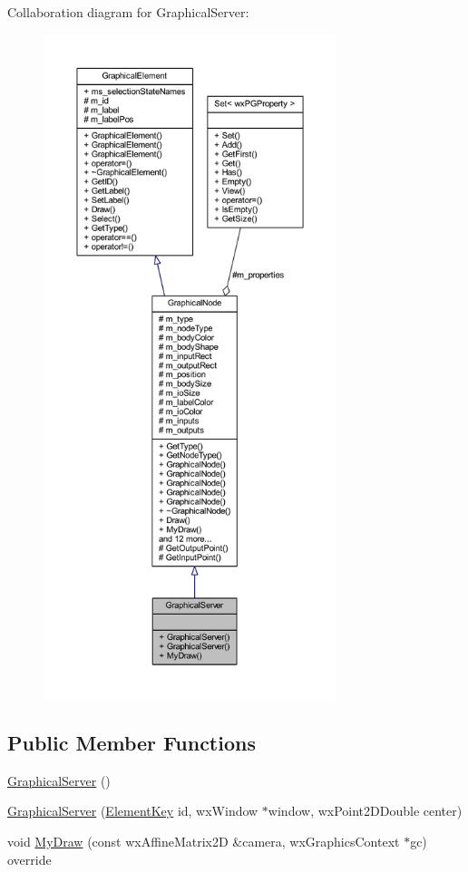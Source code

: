 Collaboration diagram for Graphical\+Server\+:
\nopagebreak
\begin{figure}[H]
\begin{center}
\leavevmode
\includegraphics[height=550pt]{class_graphical_server__coll__graph}
\end{center}
\end{figure}
\subsection*{Public Member Functions}
\begin{DoxyCompactItemize}
\item 
\hyperlink{class_graphical_server_a676ae0f9427d8dae12256c6203127541}{Graphical\+Server} ()
\item 
\hyperlink{class_graphical_server_a2690b914b1876f1eded21c1601803e93}{Graphical\+Server} (\hyperlink{_graphical_element_8h_ade5fd6c85839a416577ff9de1605141e}{Element\+Key} id, wx\+Window $\ast$window, wx\+Point2\+D\+Double center)
\item 
void \hyperlink{class_graphical_server_ad144b6cfdf945981fd0db425dfc41e5b}{My\+Draw} (const wx\+Affine\+Matrix2D \&camera, wx\+Graphics\+Context $\ast$gc) override
\end{DoxyCompactItemize}
